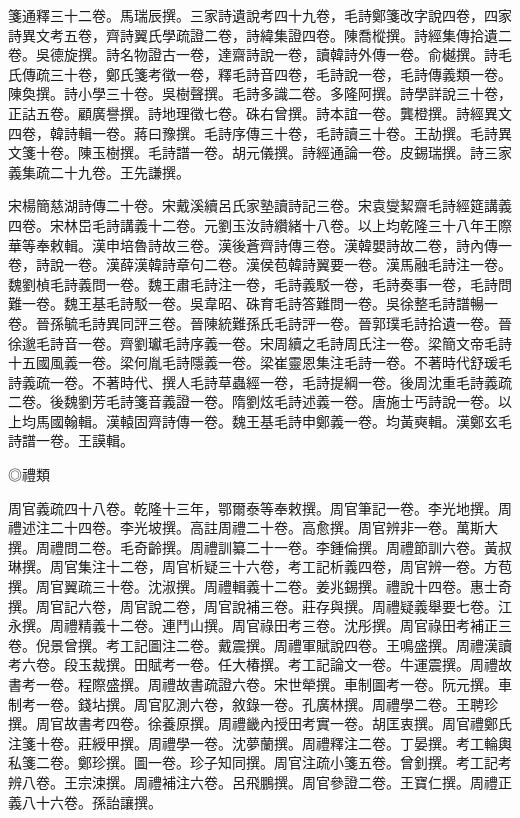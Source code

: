 \begin{pinyinscope}
箋通釋三十二卷。馬瑞辰撰。三家詩遺說考四十九卷，毛詩鄭箋改字說四卷，四家詩異文考五卷，齊詩翼氏學疏證二卷，詩緯集證四卷。陳喬樅撰。詩經集傳拾遺二卷。吳德旋撰。詩名物證古一卷，達齋詩說一卷，讀韓詩外傳一卷。俞樾撰。詩毛氏傳疏三十卷，鄭氏箋考徵一卷，釋毛詩音四卷，毛詩說一卷，毛詩傳義類一卷。陳奐撰。詩小學三十卷。吳樹聲撰。毛詩多識二卷。多隆阿撰。詩學詳說三十卷，正詁五卷。顧廣譽撰。詩地理徵七卷。硃右曾撰。詩本誼一卷。龔橙撰。詩經異文四卷，韓詩輯一卷。蔣曰豫撰。毛詩序傳三十卷，毛詩讀三十卷。王劼撰。毛詩異文箋十卷。陳玉樹撰。毛詩譜一卷。胡元儀撰。詩經通論一卷。皮錫瑞撰。詩三家義集疏二十九卷。王先謙撰。

宋楊簡慈湖詩傳二十卷。宋戴溪續呂氏家塾讀詩記三卷。宋袁燮絜齋毛詩經筵講義四卷。宋林岊毛詩講義十二卷。元劉玉汝詩纘緒十八卷。以上均乾隆三十八年王際華等奉敕輯。漢申培魯詩故三卷。漢後蒼齊詩傳三卷。漢韓嬰詩故二卷，詩內傳一卷，詩說一卷。漢薛漢韓詩章句二卷。漢侯苞韓詩翼要一卷。漢馬融毛詩注一卷。魏劉楨毛詩義問一卷。魏王肅毛詩注一卷，毛詩義駁一卷，毛詩奏事一卷，毛詩問難一卷。魏王基毛詩駁一卷。吳韋昭、硃育毛詩答難問一卷。吳徐整毛詩譜暢一卷。晉孫毓毛詩異同評三卷。晉陳統難孫氏毛詩評一卷。晉郭璞毛詩拾遺一卷。晉徐邈毛詩音一卷。齊劉瓛毛詩序義一卷。宋周續之毛詩周氏注一卷。梁簡文帝毛詩十五國風義一卷。梁何胤毛詩隱義一卷。梁崔靈恩集注毛詩一卷。不著時代舒瑗毛詩義疏一卷。不著時代、撰人毛詩草蟲經一卷，毛詩提綱一卷。後周沈重毛詩義疏二卷。後魏劉芳毛詩箋音義證一卷。隋劉炫毛詩述義一卷。唐施士丐詩說一卷。以上均馬國翰輯。漢轅固齊詩傳一卷。魏王基毛詩申鄭義一卷。均黃奭輯。漢鄭玄毛詩譜一卷。王謨輯。

◎禮類

周官義疏四十八卷。乾隆十三年，鄂爾泰等奉敕撰。周官筆記一卷。李光地撰。周禮述注二十四卷。李光坡撰。高註周禮二十卷。高愈撰。周官辨非一卷。萬斯大撰。周禮問二卷。毛奇齡撰。周禮訓纂二十一卷。李鍾倫撰。周禮節訓六卷。黃叔琳撰。周官集注十二卷，周官析疑三十六卷，考工記析義四卷，周官辨一卷。方苞撰。周官翼疏三十卷。沈淑撰。周禮輯義十二卷。姜兆錫撰。禮說十四卷。惠士奇撰。周官記六卷，周官說二卷，周官說補三卷。莊存與撰。周禮疑義舉要七卷。江永撰。周禮精義十二卷。連鬥山撰。周官祿田考三卷。沈彤撰。周官祿田考補正三卷。倪景曾撰。考工記圖注二卷。戴震撰。周禮軍賦說四卷。王鳴盛撰。周禮漢讀考六卷。段玉裁撰。田賦考一卷。任大椿撰。考工記論文一卷。牛運震撰。周禮故書考一卷。程際盛撰。周禮故書疏證六卷。宋世犖撰。車制圖考一卷。阮元撰。車制考一卷。錢坫撰。周官肊測六卷，敘錄一卷。孔廣林撰。周禮學二卷。王聘珍撰。周官故書考四卷。徐養原撰。周禮畿內授田考實一卷。胡匡衷撰。周官禮鄭氏注箋十卷。莊綬甲撰。周禮學一卷。沈夢蘭撰。周禮釋注二卷。丁晏撰。考工輪輿私箋二卷。鄭珍撰。圖一卷。珍子知同撰。周官注疏小箋五卷。曾釗撰。考工記考辨八卷。王宗涑撰。周禮補注六卷。呂飛鵬撰。周官參證二卷。王寶仁撰。周禮正義八十六卷。孫詒讓撰。


\end{pinyinscope}
